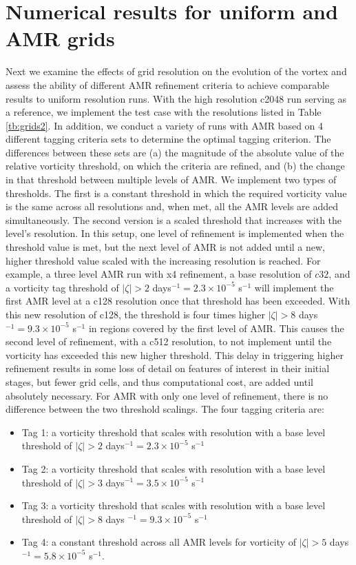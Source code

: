 \documentclass{ametsoc}
\begin{document}
\section{Numerical results for uniform and AMR grids}
\label{sec:wetvortresults}
Next we examine the effects of grid resolution on the evolution of the vortex and assess 
the ability of different AMR refinement criteria to achieve comparable results to uniform
resolution runs. With the high resolution c2048 run serving as a reference,
we implement the test case with the resolutions listed in Table \ref{tb:grids2}.
In addition, we conduct a variety of runs with AMR based on 
4 different tagging criteria sets to determine the optimal tagging criterion. 
The differences between these sets are (a) the magnitude of the absolute value of the relative 
vorticity threshold, on which the criteria are refined, and (b) the change in that threshold between multiple
levels of AMR. We implement two types of thresholds.
The first is a constant threshold in which the required vorticity value is the same 
across all resolutions and, when met, all the AMR levels are added simultaneously.
The second version is a scaled threshold that increases with the level's resolution.
In this setup, one level of refinement is implemented when the threshold value is met, but
the next level of AMR is not added until a new, higher threshold value scaled with the increasing resolution is reached.
For example, a three level AMR run with x4 refinement, a base resolution of $c32$, 
and a vorticity tag threshold of 
$|\zeta| > 2$ days$^{-1} = 2.3 \times 10^{-5}$ s$^{-1}$ will implement
the first AMR level at a c128 resolution once that threshold has been exceeded. With this new
resolution of c128, the threshold is four times higher 
$|\zeta| > 8$ days$^{-1} = 9.3 \times 10^{-5}$ s$^{-1}$ 
in regions covered by the first level of AMR. This causes the second
level of refinement, with a c512 resolution, to not implement until the vorticity has 
exceeded this new higher threshold. This delay in triggering higher refinement results 
in some loss of detail on features of interest in their initial stages, but fewer grid cells, 
and thus computational cost, are added until absolutely necessary.
For AMR with only one level of refinement, there is no difference between
the two threshold scalings.
The four tagging criteria are:
\begin{itemize}
    \item
        Tag 1: a vorticity threshold that scales with resolution 
        with a base level threshold of 
        $|\zeta| > 2$ days$^{-1} = 2.3 \times 10^{-5}$ s$^{-1}$
     \item
        Tag 2: a vorticity threshold that scales with resolution 
        with a base level threshold of 
        $|\zeta| > 3$ days$^{-1} = 3.5 \times 10^{-5}$ s$^{-1}$
     \item
        Tag 3: a vorticity threshold that scales with resolution 
        with a base level threshold of 
        $|\zeta| > 8$ days $^{-1} = 9.3 \times 10^{-5}$ s$^{-1}$
     \item
        Tag 4: a constant threshold across all AMR levels for vorticity of 
        $|\zeta| > 5$ days $^{-1} = 5.8 \times 10^{-5}$ s$^{-1}$.
\end{itemize}
\end{document}
